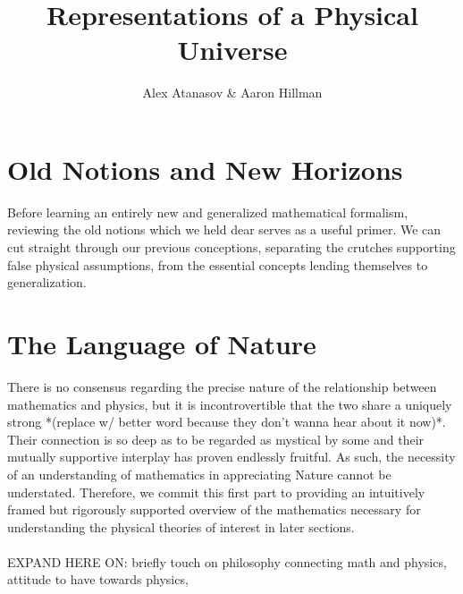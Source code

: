 \documentclass[12pt, twoside, openany]{book}
\title{Representations of a Physical Universe}
\author{Alex Atanasov \& Aaron Hillman}
\newcommand{\1}{\mathbbm{1}}
\numberwithin{conceptctr}{section}
\numberwithin{definitionctr}{section}
\begin{document}
\maketitle
\tableofcontents

\cleardoublepage
{}
\part[0]{Old Notions and New Horizons}
Before learning an entirely new and generalized mathematical formalism, reviewing the old notions which we held dear serves as a useful primer.  We can cut straight through our previous conceptions, separating the crutches supporting false physical assumptions, from the essential concepts lending themselves to generalization.  



\cleardoublepage
{}
\part{The Language of Nature}
There is no consensus regarding the precise nature of the relationship between mathematics and physics, but it is incontrovertible that the two share a uniquely strong *(replace w/ better word because they don't wanna hear about it now)*.  Their connection is so deep as to be regarded as mystical by some and their mutually supportive interplay has proven endlessly fruitful.  As such, the necessity of an understanding of mathematics in appreciating Nature cannot be understated.  Therefore, we commit this first part to providing an intuitively framed but rigorously supported overview of the mathematics necessary for understanding the physical theories of interest in later sections.\\\\
EXPAND HERE ON: briefly touch on philosophy connecting math and physics, attitude to have towards physics,     

\printindex
\end{document}
